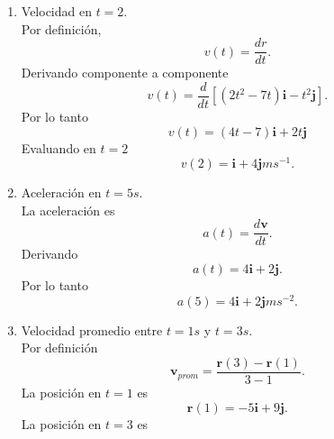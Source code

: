 \documentclass[12pt,a4paper]{article}
\begin{document}
    \begin{solucion}
        \begin{enumerate}
            \item[(a)] Velocidad en $t=2$.\\
            Por definición,
            \begin{equation*}
                v(t)=\frac{dr}{dt}.
            \end{equation*}
            Derivando componente a componente
            \begin{equation*}
                v(t)=\frac{d}{dt}[(2t^{2}-7t)\textbf{i}-t^{2}\textbf{j}].
            \end{equation*}
            Por lo tanto
            \begin{equation*}
                v(t)=(4t-7)\textbf{i}+2t\textbf{j}
            \end{equation*}
            Evaluando en $t=2$
            \begin{equation*}
                v(2)=\textbf{i}+4\textbf{j}ms^{-1}.
            \end{equation*}
            \item[(b)] Aceleración en $t=5s$.\\
            La aceleración es
            \begin{equation*}
                a(t)=\frac{d\textbf{v}}{dt}.
            \end{equation*}
            Derivando
            \begin{equation*}
                a(t)=4\textbf{i}+2\textbf{j}.
            \end{equation*}
            Por lo tanto
            \begin{equation*}
                a(5)=4\textbf{i}+2\textbf{j}ms^{-2}.
            \end{equation*}
            \item[(c)] Velocidad promedio entre $t=1s$ y $t=3s$.\\
            Por definición
            \begin{equation*}
                \textbf{v}_{prom}=\frac{\textbf{r}(3)-\textbf{r}(1)}{3-1}.
            \end{equation*}
            La posición en $t=1$ es
            \begin{equation*}
                \textbf{r}(1)=-5\textbf{i}+9\textbf{j}.
            \end{equation*}
            La posición en $t=3$ es
            \begin{equation*}

\end{equation*}
\end{enumerate}
\end{solucion}
\end{document}

